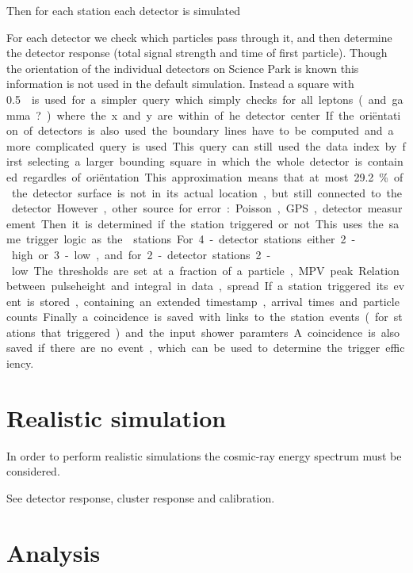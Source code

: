 Then for each station each detector is simulated

For each detector we check which particles pass through it, and then
determine the detector response (total signal strength and time of first
particle). Though the orientation of the individual detectors on Science
Park is known this information is not used in the default simulation.
Instead a square with \SI{.5}{\meter\square} is used for a simpler query
which simply checks for all leptons (and gamma?) where the x and y are
within .. of he detector center. If the oriëntation of detectors is also
used the boundary lines have to be computed and a more complicated query
is used. This query can still used the data index by first selecting a
larger bounding square in which the whole detector is contained
regardles of oriëntation. This approximation means that at most
\SI{29.2}{\percent} of the detector surface is not in its actual
location, but still connected to the detector. However, other source for
error: Poisson, GPS, detector measurement .

Then it is determined if the station triggered or not. This uses the
same trigger logic as the \hisparc stations. For 4-detector stations
either 2-high or 3-low, and for 2-detector stations 2-low. The
thresholds are set at a fraction of a particle, MPV peak.. Relation
between pulseheight and integral in data, spread..

If a station triggered its event is stored, containing an extended
timestamp, arrival times and particle counts.

Finally a coincidence is saved with links to the station events (for
stations that triggered) and the input shower paramters. A coincidence
is also saved if there are no event, which can be used to determine the
trigger efficiency.


\section{Realistic simulation}

In order to perform realistic simulations the cosmic-ray energy spectrum
must be considered.



See detector response, cluster response and calibration.


\section{Analysis}

